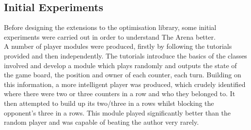 \subsection{Initial Experiments}
Before designing the extensions to the optimisation library, some initial experiments were carried out in order to understand The Arena better.
\\A number of player modules were produced, firstly by following the tutorials provided\cite{arena} and then independently. The tutorials introduce the basics of the classes involved and develop a module which plays randomly and outputs the state of the game board, the position and owner of each counter, each turn. Building on this information, a more intelligent player was produced, which crudely identified where there were two or three counters in a row and who they belonged to. It then attempted to build up its two/three in a rows whilst blocking the opponent's three in a rows. This module played significantly better than the random player and was capable of beating the author very rarely.

